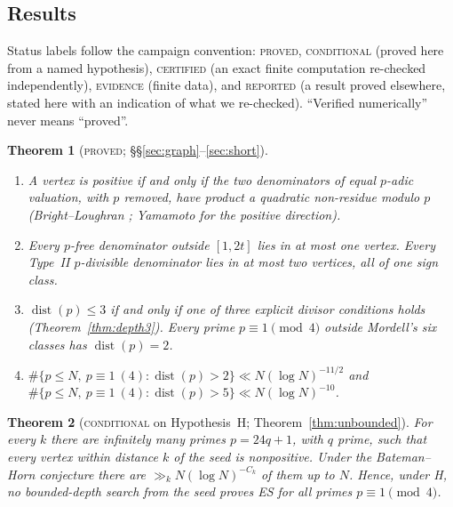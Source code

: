 \documentclass[11pt,reqno]{amsart}
\newtheorem{introthm}{Theorem}
\theoremstyle{definition}
\newcommand{\dist}{\operatorname{dist}}
\newcommand{\status}[1]{\textsc{#1}}
\begin{document}
\subsection{Results}
Status labels follow the campaign convention: \status{proved},
\status{conditional} (proved here from a named hypothesis),
\status{certified} (an exact finite computation re-checked independently),
\status{evidence} (finite data), and \status{reported} (a result proved
elsewhere, stated here with an indication of what we re-checked).  ``Verified numerically'' never means ``proved''.

\begin{introthm}[\status{proved}; \S\S\ref{sec:graph}--\ref{sec:short}]\label{thmA}
\leavevmode
\begin{enumerate}
\item A vertex is positive if and only if the two denominators of equal
$p$-adic valuation, with $p$ removed, have product a quadratic non-residue
modulo $p$ \emph{(Bright--Loughran \cite{BL}; Yamamoto for the positive
direction)}.
\item Every $p$-free denominator outside $[1,2t]$ lies in at most one vertex.
Every Type~II $p$-divisible denominator lies in at most two vertices, all of
one sign class.
\item $\dist(p)\le3$ if and only if one of three explicit divisor conditions
holds (Theorem~\ref{thm:depth3}).  Every prime $p\equiv1\pmod4$ outside
Mordell's six classes has $\dist(p)=2$.
\item $\#\{p\le N,\ p\equiv1\ (4):\dist(p)>2\}\ll N(\log N)^{-11/2}$ and
$\#\{p\le N,\ p\equiv1\ (4):\dist(p)>5\}\ll N(\log N)^{-10}$.
\end{enumerate}
\end{introthm}

\begin{introthm}[\status{conditional} on Hypothesis~H; Theorem~\ref{thm:unbounded}]\label{thmB}
For every $k$ there are infinitely many primes $p=24q+1$, with $q$ prime,
such that every vertex within distance $k$ of the seed is nonpositive.  Under
the Bateman--Horn conjecture there are $\gg_k N(\log N)^{-C_k}$ of them up to
$N$.  Hence, under H, no bounded-depth search from the seed proves ES for
all primes $p\equiv1\pmod4$.
\end{introthm}
\end{document}
